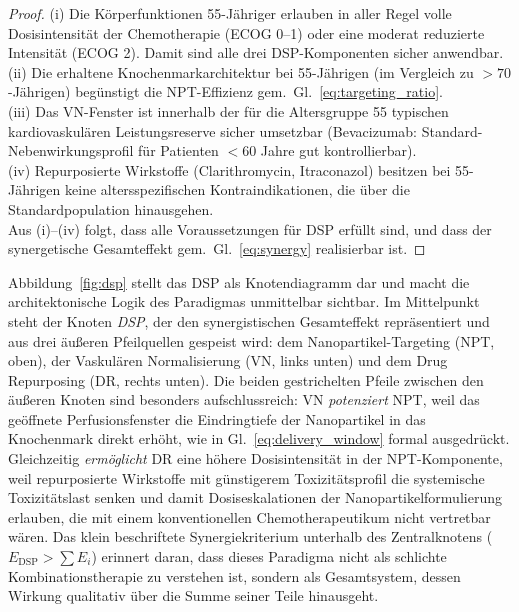 ﻿\documentclass[12pt,a4paper]{article}
\theoremstyle{definition}
\begin{document}
\begin{proof}
  (i) Die Körperfunktionen 55-Jähriger erlauben in aller Regel volle Dosisintensität
  der Chemotherapie (ECOG 0--1) oder eine moderat reduzierte Intensität (ECOG 2).
  Damit sind alle drei DSP-Komponenten sicher anwendbar.\\
  (ii) Die erhaltene Knochenmarkarchitektur bei 55-Jährigen (im Vergleich zu
  $>70$-Jährigen) begünstigt die NPT-Effizienz gem.\ Gl.~\eqref{eq:targeting_ratio}.\\
  (iii) Das VN-Fenster ist innerhalb der für die Altersgruppe 55 typischen kardiovaskulären
  Leistungsreserve sicher umsetzbar (Bevacizumab: Standard-Nebenwirkungsprofil für
  Patienten $<60$ Jahre gut kontrollierbar).\\
  (iv) Repurposierte Wirkstoffe (Clarithromycin, Itraconazol) besitzen bei 55-Jährigen
  keine altersspezifischen Kontraindikationen, die über die Standardpopulation
  hinausgehen.\\
  Aus (i)--(iv) folgt, dass alle Voraussetzungen für DSP erfüllt sind, und dass
  der synergetische Gesamteffekt gem.\ Gl.~\eqref{eq:synergy} realisierbar ist.

\end{proof}

Abbildung~\ref{fig:dsp} stellt das DSP als Knotendiagramm dar und macht die
architektonische Logik des Paradigmas unmittelbar sichtbar. Im Mittelpunkt steht
der Knoten \emph{DSP}, der den synergistischen Gesamteffekt repräsentiert und
aus drei äußeren Pfeilquellen gespeist wird: dem Nanopartikel-Targeting (NPT, oben),
der Vaskulären Normalisierung (VN, links unten) und dem Drug Repurposing (DR, rechts
unten). Die beiden gestrichelten Pfeile zwischen den äußeren Knoten sind besonders
aufschlussreich: VN \emph{potenziert} NPT, weil das geöffnete Perfusionsfenster
die Eindringtiefe der Nanopartikel in das Knochenmark direkt erhöht, wie in
Gl.~\eqref{eq:delivery_window} formal ausgedrückt. Gleichzeitig \emph{ermöglicht}
DR eine höhere Dosisintensität in der NPT-Komponente, weil repurposierte Wirkstoffe
mit günstigerem Toxizitätsprofil die systemische Toxizitätslast senken und damit
Dosiseskalationen der Nanopartikelformulierung erlauben, die mit einem konventionellen
Chemotherapeutikum nicht vertretbar wären. Das klein beschriftete Synergiekriterium
unterhalb des Zentralknotens ($E_{\mathrm{DSP}} > \sum E_i$) erinnert daran, dass
dieses Paradigma nicht als schlichte Kombinationstherapie zu verstehen ist, sondern
als Gesamtsystem, dessen Wirkung qualitativ über die Summe seiner Teile hinausgeht.
\end{document}
